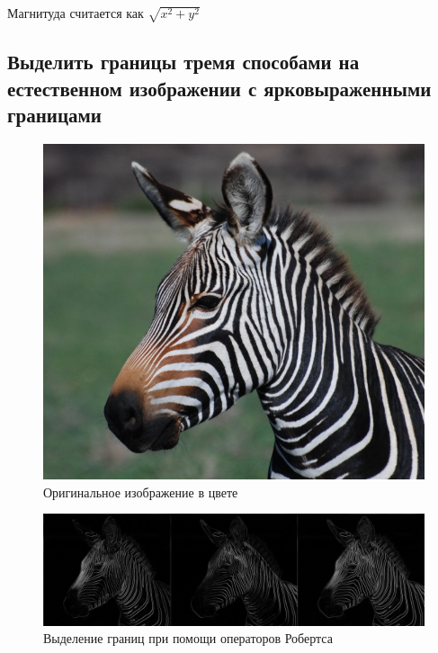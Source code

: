 Магнитуда считается как $\sqrt{x^2 + y^2}$



\subsection{Выделить границы тремя способами на естественном изображении с ярковыраженными границами}

\begin{figure}[H]
	\begin{center}
		\includegraphics[scale=0.5]{zebra.jpg}
		\caption{Оригинальное изображение в цвете} 
		\label{pic:hist_orig} %
	\end{center}
\end{figure}
\begin{figure}[H]
	\begin{center}
		\includegraphics[scale=0.2]{robrts_all_2.jpg}
		\caption{Выделение границ при помощи операторов Робертса} 
		\label{pic:hist_orig} %
	\end{center}
\end{figure}
